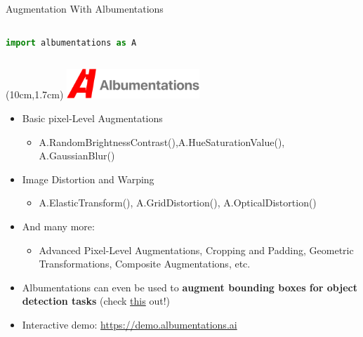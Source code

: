 \documentclass[serif, aspectratio=169]{beamer}
\begin{document}
\begin{frame}[fragile]{Augmentation With Albumentations}

	\begin{column}{.43\textwidth}
\begin{lstlisting}[language=python]
import albumentations as A
\end{lstlisting}
	\end{column}
	
	\begin{textblock*}{5cm}(10cm,1.7cm) %
		\includegraphics[keepaspectratio, width=5cm]{pic/Albumentations}
	\end{textblock*}
	
	\vspace{0.5cm}
	\begin{itemize}
		\item Basic pixel-Level Augmentations
		\begin{itemize}
			\item 
			{\sffamily A.RandomBrightnessContrast(),A.HueSaturationValue(), 
				A.GaussianBlur()}
		\end{itemize}
		
		\item Image Distortion and Warping
		\begin{itemize}
			\item {\sffamily A.ElasticTransform(), A.GridDistortion(), A.OpticalDistortion()}
		\end{itemize}
		\item And many more:
		\begin{itemize}
			\item Advanced Pixel-Level Augmentations, Cropping and Padding, Geometric Transformations, Composite Augmentations, etc.
		\end{itemize}
		\item Albumentations can even be used to \textbf{augment bounding boxes for object detection tasks} (check \href{https://albumentations.ai/docs/examples/example_bboxes/}{\color{blue}this} out!)
		\item Interactive demo: \href{https://demo.albumentations.ai}{\color{blue} https://demo.albumentations.ai}

	\end{itemize}
\end{frame}
\end{document}
